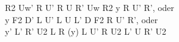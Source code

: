 R2 Uw' R U' R U R' Uw R2 y R U' R', oder\\
y F2 D' L U' L U L' D F2 R U' R', oder\\
y' L' R' U2 L R (y) L U' R U2 L' U R' U2\\
